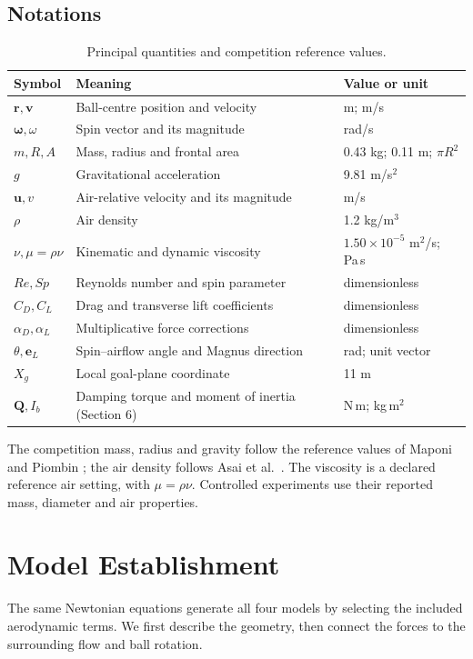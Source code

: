 \documentclass[12pt,letterpaper]{article}
\begin{document}
\subsection{Notations}
\begin{table}[H]\centering\small
\caption{Principal quantities and competition reference values.}\label{tab:notations}
\begin{tabular}{p{}p{}p{}}\toprule
Symbol & Meaning & Value or unit\\\midrule
$\boldsymbol r,\boldsymbol v$ & Ball-centre position and velocity & m; m/s\\
$\boldsymbol\omega,\omega$ & Spin vector and its magnitude & rad/s\\
$m,R,A$ & Mass, radius and frontal area & 0.43 kg; 0.11 m; $\pi R^2$\\
$g$ & Gravitational acceleration & 9.81 m/s$^2$\\
$\boldsymbol u,v$ & Air-relative velocity and its magnitude & m/s\\
$\rho$ & Air density & 1.2 kg/m$^3$\\
$\nu,\mu=\rho\nu$ & Kinematic and dynamic viscosity & $1.50\times10^{-5}$ m$^2$/s; Pa\,s\\
$Re,Sp$ & Reynolds number and spin parameter & dimensionless\\
$C_D,C_L$ & Drag and transverse lift coefficients & dimensionless\\
$\alpha_D,\alpha_L$ & Multiplicative force corrections & dimensionless\\
$\theta,\boldsymbol e_L$ & Spin--airflow angle and Magnus direction & rad; unit vector\\
$X_g$ & Local goal-plane coordinate & 11 m\\
$\boldsymbol Q,I_b$ & Damping torque and moment of inertia (Section 6) & N\,m; kg\,m$^2$\\\bottomrule
\end{tabular}\end{table}
The competition mass, radius and gravity follow the reference values of Maponi and Piombin \cite{maponi}; the air density follows Asai et al.\ \cite{asai2007}. The viscosity is a declared reference air setting, with $\mu=\rho\nu$. Controlled experiments use their reported mass, diameter and air properties.

\section{Model Establishment}
The same Newtonian equations generate all four models by selecting the included aerodynamic terms. We first describe the geometry, then connect the forces to the surrounding flow and ball rotation.
\end{document}
